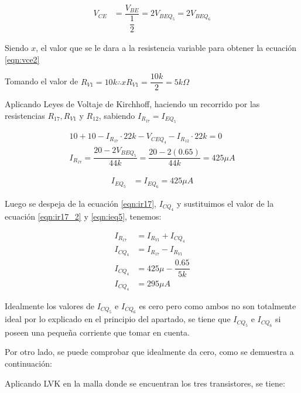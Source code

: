 \begin{enumerate}
        \begin{align}
          V_{CE} & =\dfrac{V_{BE} }{\dfrac{1}{2}} = 2 V_{BEQ_5}= 2 V_{BEQ_6}\label{eqn:vce2}
        \end{align}

        Siendo $x$, el valor que se le dara a la resistencia variable para obtener la ecuación \ref{eqn:vce2}

        Tomando el valor de $R_{V1}=10k \therefore xR_{V1}=\dfrac{10k}{2} =5k \Omega$

        Aplicando Leyes de Voltaje de Kirchhoff, haciendo un recorrido por las resistencias $R_{17}, R_{V1}$ y $R_{12}$, sabiendo $I_{R_{17}}={I_{EQ_5}}$

        \begin{align*}
          10+10-I_{R_{17}}\cdot 22k-V_{CEQ_4} -I_{R_{12}}\cdot 22k = 0 \\[0.2cm]
          I_{R_{17}}= \dfrac{20-2 V_{BEQ_5}}{44k}=\dfrac{20-2 (0.65)}{44k}=425 \mu A
        \end{align*}

        \begin{align}
          I_{EQ_5} & =I_{EQ_6}=425 \mu A
          \label{eqn:ieq5}
        \end{align}

        Luego se despeja de la ecuación \ref{eqn:ir17}, $I_{CQ_4}$ y sustituimos el valor de la ecuación \ref{eqn:ir17_2} y \ref{eqn:ieq5}, tenemos:

        \begin{align}
          I_{R_{17}} & =I_{R_{V1}}+I_{CQ_4} \nonumber       \\[0.2cm]
          I_{CQ_4}   & = I_{R_{17}}-I_{R_{V1}} \nonumber    \\[0.2cm]
          I_{CQ_4}   & = 425 \mu-\dfrac{0.65}{5k} \nonumber \\[0.2cm]
          I_{CQ_4}   & = 295 \mu A \label{eqn:icq4}
        \end{align}

        Idealmente los valores de $I_{CQ_5}$ e $I_{CQ_6}$ es cero pero como ambos no son totalmente ideal por lo explicado en el principio del apartado, se tiene que $I_{CQ_5}$ e $I_{CQ_6}$ si poseen una pequeña corriente que tomar en cuenta.

        Por otro lado, se puede comprobar que idealmente da cero, como se demuestra a continuación:

        Aplicando LVK en la malla donde se encuentran los tres transistores, se tiene:


\end{enumerate}
